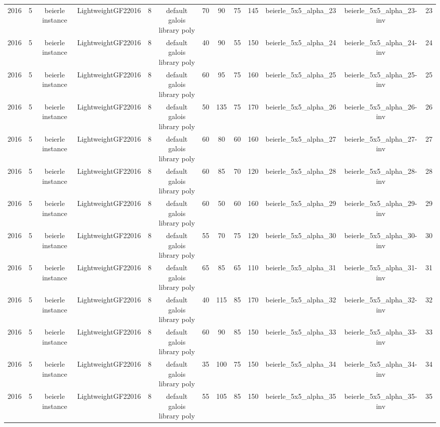 \begin{tabular}{c c c c c c c c c c c c c}
2016 & 5 & beierle instance & LightweightGF22016 & 8 & default galois library poly & 70 & 90 & 75 & 145 & beierle_5x5_alpha_23 & beierle_5x5_alpha_23-inv & 23 \\
2016 & 5 & beierle instance & LightweightGF22016 & 8 & default galois library poly & 40 & 90 & 55 & 150 & beierle_5x5_alpha_24 & beierle_5x5_alpha_24-inv & 24 \\
2016 & 5 & beierle instance & LightweightGF22016 & 8 & default galois library poly & 60 & 95 & 75 & 160 & beierle_5x5_alpha_25 & beierle_5x5_alpha_25-inv & 25 \\
2016 & 5 & beierle instance & LightweightGF22016 & 8 & default galois library poly & 50 & 135 & 75 & 170 & beierle_5x5_alpha_26 & beierle_5x5_alpha_26-inv & 26 \\
2016 & 5 & beierle instance & LightweightGF22016 & 8 & default galois library poly & 60 & 80 & 60 & 160 & beierle_5x5_alpha_27 & beierle_5x5_alpha_27-inv & 27 \\
2016 & 5 & beierle instance & LightweightGF22016 & 8 & default galois library poly & 60 & 85 & 70 & 120 & beierle_5x5_alpha_28 & beierle_5x5_alpha_28-inv & 28 \\
2016 & 5 & beierle instance & LightweightGF22016 & 8 & default galois library poly & 60 & 50 & 60 & 160 & beierle_5x5_alpha_29 & beierle_5x5_alpha_29-inv & 29 \\
2016 & 5 & beierle instance & LightweightGF22016 & 8 & default galois library poly & 55 & 70 & 75 & 120 & beierle_5x5_alpha_30 & beierle_5x5_alpha_30-inv & 30 \\
2016 & 5 & beierle instance & LightweightGF22016 & 8 & default galois library poly & 65 & 85 & 65 & 110 & beierle_5x5_alpha_31 & beierle_5x5_alpha_31-inv & 31 \\
2016 & 5 & beierle instance & LightweightGF22016 & 8 & default galois library poly & 40 & 115 & 85 & 170 & beierle_5x5_alpha_32 & beierle_5x5_alpha_32-inv & 32 \\
2016 & 5 & beierle instance & LightweightGF22016 & 8 & default galois library poly & 60 & 90 & 85 & 150 & beierle_5x5_alpha_33 & beierle_5x5_alpha_33-inv & 33 \\
2016 & 5 & beierle instance & LightweightGF22016 & 8 & default galois library poly & 35 & 100 & 75 & 150 & beierle_5x5_alpha_34 & beierle_5x5_alpha_34-inv & 34 \\
2016 & 5 & beierle instance & LightweightGF22016 & 8 & default galois library poly & 55 & 105 & 85 & 150 & beierle_5x5_alpha_35 & beierle_5x5_alpha_35-inv & 35 \\

\end{tabular}

